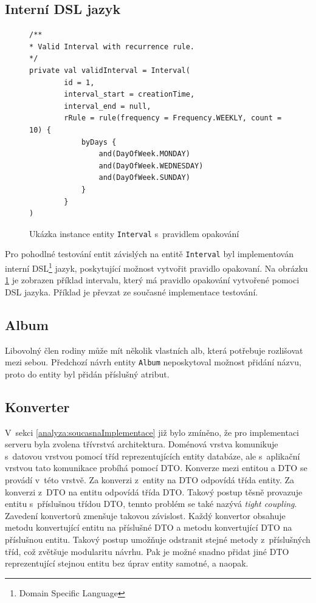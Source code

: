    \subsection{Interní DSL jazyk}\label{navrh:zmeny:dsl}
        \begin{figure}
            \begin{verbatim}
/**
* Valid Interval with recurrence rule.
*/
private val validInterval = Interval(
        id = 1,
        interval_start = creationTime,
        interval_end = null,
        rRule = rule(frequency = Frequency.WEEKLY, count = 10) {
            byDays {
                and(DayOfWeek.MONDAY)
                and(DayOfWeek.WEDNESDAY)
                and(DayOfWeek.SUNDAY)
            }
        }
)
            \end{verbatim}
            \caption{Ukázka instance entity \texttt{Interval} s~pravidlem opakování} 
            \label{code:valid-interval}
        \end{figure}
        Pro pohodlné testování entit závislých na entitě \verb|Interval| byl implementován interní DSL\footnote{Domain Specific Language} jazyk, poskytující možnost vytvořit pravidlo opakovaní. Na obrázku \ref{code:valid-interval} je zobrazen příklad intervalu, který má pravidlo opakování vytvořené pomoci DSL jazyka. Příklad je převzat ze současné implementace testování.

    \subsection{Album}
        Libovolný člen rodiny může mít několik vlastních alb, která potřebuje rozlišovat mezi sebou. Předchozí návrh entity \verb|Album| neposkytoval možnost přidání názvu, proto do entity byl přidán příslušný atribut.
        
    \subsection{Konverter}
        V~sekci \ref{analyza:soucasnaImplementace} již bylo zmíněno, že pro implementaci serveru byla zvolena třívrstvá architektura. Doménová vrstva komunikuje s~datovou vrstvou pomocí tříd reprezentujících entity databáze, ale s~aplikační vrstvou tato komunikace probíhá pomocí DTO. Konverze mezi entitou a DTO se provádí v~této vrstvě. Za konverzi z~entity na DTO odpovídá třída entity. Za konverzi z~DTO na entitu odpovídá třída DTO.
        Takový postup těsně provazuje entitu s~příslušnou třídou DTO, tennto problém se také nazývá \textit{tight coupling}. Zavedení konvertorů zmenšuje takovou závislost. Každý konvertor obsahuje metodu konvertující entitu na příslušné DTO a metodu konvertující DTO na příslušnou entitu. Takový postup umožňuje odstranit stejné metody z~příslušných tříd, což zvětšuje modularitu návrhu. 
        Pak je možné snadno přidat jiné DTO reprezentující stejnou entitu bez úprav entity samotné, a naopak.
        
